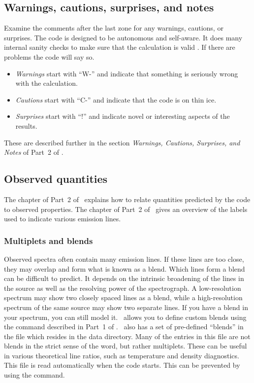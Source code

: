\documentclass[12pt,twoside]{article}
\begin{document}
\subsection{Warnings, cautions, surprises, and notes}
\label{sec:WarningsCautionsSurprisesNotes}

Examine the comments after the last zone for any warnings, cautions,
or surprises.
The code is designed to be autonomous and self-aware.  It
does many internal sanity checks to make sure that the calculation is valid
\citep{FerlandReliability01}.
If there are problems the code will say so.

\begin{itemize}

\item \emph{Warnings} start
with ``W-'' and indicate that something is seriously wrong with the
calculation.

\item \emph{Cautions} start with
``C-'' and indicate that the code is on
thin ice.

\item \emph{Surprises} start with ``!'' and indicate novel or interesting
aspects of the results.
\end{itemize}

These are described further in the section
\emph{Warnings, Cautions, Surprises, and Notes} of Part~2 of \Hazy.

\subsection{Observed quantities}

The chapter  of
Part~2 of \Hazy\ explains how to relate
quantities predicted by the code to observed properties.
The chapter  of Part~2 of \Hazy\ gives an overview of the labels used to
indicate various emission lines.

\subsubsection{Multiplets and blends}

Observed spectra often contain many emission lines. If these lines are too
close, they may overlap and form what is known as a blend. Which lines form a
blend can be difficult to predict. It depends on the intrinsic broadening of
the lines in the source as well as the resolving power of the spectrograph. A
low-resolution spectrum may show two closely spaced lines as a blend, while a
high-resolution spectrum of the same source may show two separate lines. If
you have a blend in your spectrum, you can still model it. \Cloudy\ allows you
to define custom blends using the  command described in
Part~1 of \Hazy. \Cloudy\ also has a set of pre-defined ``blends'' in the file
 which resides in the data directory. Many of the
entries in this file are not blends in the strict sense of the word, but
rather multiplets. These can be useful in various theoretical line ratios, such
as temperature and density diagnostics. This file is read automatically when
the code starts. This can be prevented by using the 
command.
\end{document}
